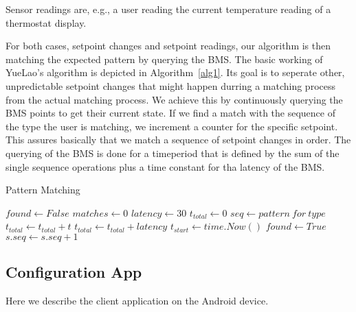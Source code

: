 Sensor readings are, e.g., a user reading the current temperature reading of a thermostat display.

For both cases, setpoint changes and setpoint readings,  our algorithm is then matching the expected pattern by querying the BMS.
The basic working of YueLao's algorithm is depicted in Algorithm~\ref{alg1}.
Its goal is to seperate other, unpredictable setpoint changes that might happen durring a matching process from the actual matching process.
We achieve this by continuously querying the BMS points to get their current state. If we find a match with the sequence of the type the user is matching, we increment a counter for the specific setpoint. This assures basically that we match a sequence of setpoint changes in order.
The querying of the BMS is done for a timeperiod that is defined by the sum of the single sequence operations plus a time constant for tha latency of the BMS.

 \begin{algorithm}
 \caption{Pattern Matching}
 \label{alg1}
 \begin{algorithmic}
 \STATE $found \leftarrow False$
 \STATE $matches \leftarrow 0$
 \STATE $latency \leftarrow 30$
 \STATE $t_{total} \leftarrow 0$
 \STATE $seq \leftarrow pattern~for~type$
 \STATE $t_{total} \leftarrow t_{total} + t$
 \ENDFOR
 \STATE $t_{total} \leftarrow t_{total} + latency$
 \STATE $t_{start} \leftarrow time.Now()$
       \STATE $found \leftarrow True$
     \ENDIF
     \STATE $s.seq \leftarrow s.seq +1$
   \ENDIF
\ENDFOR
 \ENDWHILE
 \end{algorithmic}
 \end{algorithm}


\subsection{Configuration App} %
\label{sub:configuration_app}
Here we describe the client application on the Android device.

